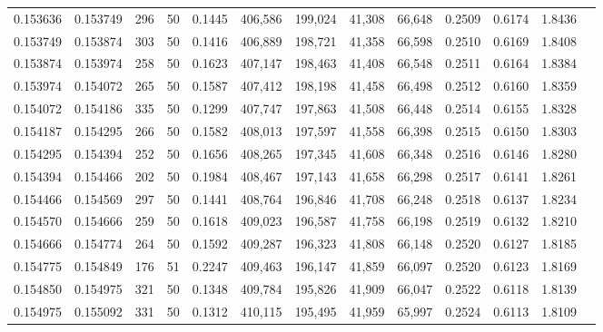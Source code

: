 \begin{tabular}{rrrrrrrrrrrrr}
0.153636 & 0.153749 &   296 &  50 &                                     0.1445 & 406,586 & 199,024 &  41,308 &  66,648 & 0.2509 & 0.6174 & 1.8436 \\
0.153749 & 0.153874 &   303 &  50 &                                     0.1416 & 406,889 & 198,721 &  41,358 &  66,598 & 0.2510 & 0.6169 & 1.8408 \\
0.153874 & 0.153974 &   258 &  50 &                                     0.1623 & 407,147 & 198,463 &  41,408 &  66,548 & 0.2511 & 0.6164 & 1.8384 \\
0.153974 & 0.154072 &   265 &  50 &                                     0.1587 & 407,412 & 198,198 &  41,458 &  66,498 & 0.2512 & 0.6160 & 1.8359 \\
0.154072 & 0.154186 &   335 &  50 &                                     0.1299 & 407,747 & 197,863 &  41,508 &  66,448 & 0.2514 & 0.6155 & 1.8328 \\
0.154187 & 0.154295 &   266 &  50 &                                     0.1582 & 408,013 & 197,597 &  41,558 &  66,398 & 0.2515 & 0.6150 & 1.8303 \\
0.154295 & 0.154394 &   252 &  50 &                                     0.1656 & 408,265 & 197,345 &  41,608 &  66,348 & 0.2516 & 0.6146 & 1.8280 \\
0.154394 & 0.154466 &   202 &  50 &                                     0.1984 & 408,467 & 197,143 &  41,658 &  66,298 & 0.2517 & 0.6141 & 1.8261 \\
0.154466 & 0.154569 &   297 &  50 &                                     0.1441 & 408,764 & 196,846 &  41,708 &  66,248 & 0.2518 & 0.6137 & 1.8234 \\
0.154570 & 0.154666 &   259 &  50 &                                     0.1618 & 409,023 & 196,587 &  41,758 &  66,198 & 0.2519 & 0.6132 & 1.8210 \\
0.154666 & 0.154774 &   264 &  50 &                                     0.1592 & 409,287 & 196,323 &  41,808 &  66,148 & 0.2520 & 0.6127 & 1.8185 \\
0.154775 & 0.154849 &   176 &  51 &                                     0.2247 & 409,463 & 196,147 &  41,859 &  66,097 & 0.2520 & 0.6123 & 1.8169 \\
0.154850 & 0.154975 &   321 &  50 &                                     0.1348 & 409,784 & 195,826 &  41,909 &  66,047 & 0.2522 & 0.6118 & 1.8139 \\
0.154975 & 0.155092 &   331 &  50 &                                     0.1312 & 410,115 & 195,495 &  41,959 &  65,997 & 0.2524 & 0.6113 & 1.8109 \\

\end{tabular}
